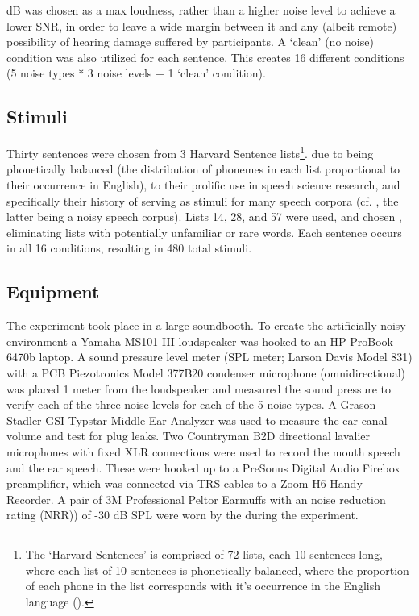 \DIFaddbegin {} dB was chosen as a max loudness, rather than a higher noise level to achieve a lower SNR, in order to leave a wide margin between it and any (albeit remote) possibility of hearing damage suffered by participants.  A `clean' (no noise) condition was also utilized for each sentence.  This creates 16 different conditions (5 noise types * 3 noise levels + 1 `clean' condition).  

\subsection{Stimuli}
Thirty sentences were chosen from 3 Harvard Sentence lists\footnote{The `Harvard Sentences' \DIFaddbegin {}\DIFaddend is comprised of 72 lists, each 10 sentences long, where each list of 10 sentences is phonetically balanced, where the proportion of each phone in the list corresponds with it's occurrence in the English language (\cite{harvardSents}).}.  \DIFdelbegin {}\DIFdelend \DIFaddbegin {}\DIFaddend due to being phonetically balanced (the distribution of phonemes in each list proportional to their occurrence in English), to their prolific use in speech science research, and specifically their history of serving as stimuli for many speech corpora (cf. \cite{kabal:02,hu:07}, the latter being a noisy speech corpus).  Lists 14, 28, and 57 were used, and chosen \DIFdelbegin {}\DIFdelend \DIFaddbegin {}\DIFaddend , eliminating lists with potentially unfamiliar or rare words.  Each sentence occurs in all 16 conditions, resulting in 480 total stimuli.

  
\subsection{Equipment}

The experiment took place in a large soundbooth.  To create the artificially noisy environment a Yamaha MS101 III loudspeaker was hooked to an HP ProBook 6470b laptop.  A sound pressure level meter (SPL meter; Larson Davis Model 831) with a PCB Piezotronics Model 377B20 condenser microphone (omnidirectional) was placed 1 meter from the loudspeaker and measured the sound pressure to verify each of the three noise levels for each of the 5 noise types. A Grason-Stadler GSI Typstar Middle Ear Analyzer was used to measure the ear canal volume and test for plug leaks.  Two Countryman B2D directional lavalier microphones with fixed XLR connections were used to record the mouth speech and the ear speech.  These were hooked up to a PreSonus Digital Audio Firebox preamplifier, which was connected via TRS cables to a Zoom H6 Handy Recorder. A pair of 3M Professional Peltor Earmuffs with an noise reduction rating (NRR)) of -30 dB SPL were worn by the \DIFdelbegin {}\DIFdelend \DIFaddbegin {}\DIFaddend during the experiment.


